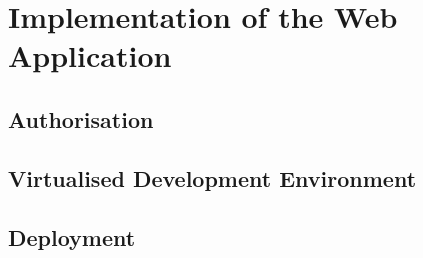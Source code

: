 \chapter{Implementation of the Web Application}



\section{Authorisation}

\section{Virtualised Development Environment}

\section{Deployment}
